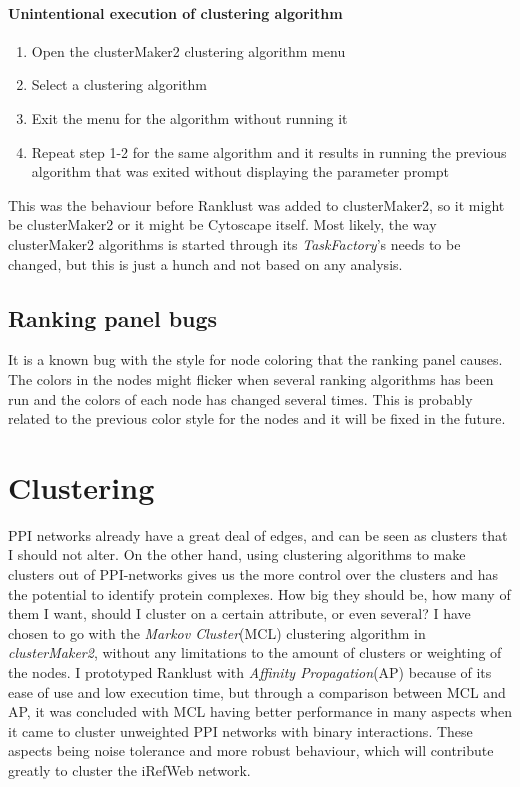 \paragraph{Unintentional execution of clustering algorithm}
\begin{enumerate}
    \item Open the clusterMaker2 clustering algorithm menu
    \item Select a clustering algorithm
    \item Exit the menu for the algorithm without running it
    \item Repeat step 1-2 for the same algorithm and it results in running the
        previous algorithm that was exited without displaying the parameter
        prompt
\end{enumerate}
This was the behaviour before Ranklust was added to clusterMaker2,
so it might be clusterMaker2 or it might be Cytoscape itself. Most likely, the
way clusterMaker2 algorithms is started through its \textit{TaskFactory}'s needs
to be changed, but this is just a hunch and not based on any analysis.

\subsection{Ranking panel bugs}
It is a known bug with the style for node coloring that the ranking panel
causes. The colors in the nodes might flicker when several ranking algorithms
has been run and the colors of each node has changed several times. This is
probably related to the previous color style for the nodes and it will be fixed
in the future.

\section{Clustering}
PPI networks already have a great deal of edges, and can be seen as clusters
that I should not alter. On the other hand, using clustering algorithms to make
clusters out of PPI-networks gives us the more control over the clusters and has
the potential to identify protein complexes\cite{ap-vs-mcl}. How big they should
be, how many of them I want, should I cluster on a certain attribute, or even
several? I have chosen to go with the \textit{Markov Cluster}(MCL)\cite{mcl}
clustering algorithm in \textit{clusterMaker2}, without any limitations to the
amount of clusters or weighting of the nodes. I prototyped Ranklust with
\textit{Affinity Propagation}(AP)\cite{affinity-propagation} because of its ease
of use and low execution time, but through a comparison between MCL and AP, it
was concluded with MCL having better performance in many aspects when it came to
cluster unweighted PPI networks\cite{ap-vs-mcl} with binary interactions. These
aspects being noise tolerance and more robust behaviour, which will contribute
greatly to cluster the iRefWeb network.

